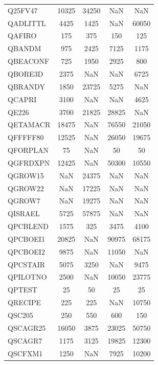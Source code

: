 \begin{longtable}{lcccc}
Q25FV47  &    10325 & 34250 &      NaN &      NaN \\
QADLITTL &     4425 &  1425 &      NaN &    60050 \\
QAFIRO   &      175 &   375 &      150 &      125 \\
QBANDM   &      975 &  2425 &     7125 &     1175 \\
QBEACONF &      725 &  1950 &     2925 &      800 \\
QBORE3D  &     2375 &   NaN &      NaN &     6725 \\
QBRANDY  &     1850 & 23725 &     5275 &      NaN \\
QCAPRI   &     3100 &   NaN &      NaN &     4625 \\
QE226    &     3700 & 21825 &    28825 &      NaN \\
QETAMACR &    18475 &   NaN &    76550 &    21050 \\
QFFFFF80 &    12525 &   NaN &    26050 &    19675 \\
QFORPLAN &       75 &   NaN &       50 &       50 \\
QGFRDXPN &    12425 &   NaN &    50300 &    10550 \\
QGROW15  &      NaN & 24375 &      NaN &      NaN \\
QGROW22  &      NaN & 17225 &      NaN &      NaN \\
QGROW7   &      NaN & 19275 &      NaN &      NaN \\
QISRAEL  &     5725 & 57875 &      NaN &      NaN \\
QPCBLEND &     1575 &   325 &     3475 &     4100 \\
QPCBOEI1 &    20825 &   NaN &    90975 &    68175 \\
QPCBOEI2 &     9875 &   NaN &    11050 &      NaN \\
QPCSTAIR &     5075 &  3250 &      NaN &     9475 \\
QPILOTNO &     2500 &   NaN &    10050 &    23775 \\
QPTEST   &       25 &    50 &       25 &       25 \\
QRECIPE  &      225 &   225 &      NaN &    10750 \\
QSC205   &      250 &   550 &      600 &      150 \\
QSCAGR25 &    16050 &  3875 &    23025 &    50750 \\
QSCAGR7  &     1175 &  3125 &    19825 &    12300 \\
QSCFXM1  &     1250 &   NaN &     7925 &    10200 \\

\end{longtable}
